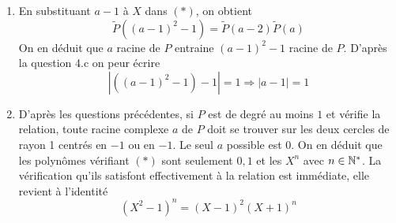 \begin{enumerate}
 \item En substituant $a-1$ à $X$ dans $(*)$, on obtient
\begin{displaymath}
 \widetilde{P}((a-1)^2-1)=\widetilde{P}(a-2)\widetilde{P}(a)
\end{displaymath}
On en déduit que $a$ racine de $P$ entraine $(a-1)^2-1$ racine de $P$. D'après la question 4.c on peur écrire 
\begin{displaymath}
|\left( (a-1)^2-1\right) -1|=1 \Rightarrow |a-1| = 1
\end{displaymath}

 \item D'après les questions précédentes, si $P$ est de degré au moins $1$ et vérifie la relation, toute racine complexe $a$ de $P$ doit se trouver sur les deux cercles de rayon 1 centrés en $-1$ ou en $-1$. Le seul $a$ possible est $0$. On en déduit que les polynômes vérifiant $(*)$ sont seulement $0,1$ et les $X^n$ avec $n\in \mathbb{N}^*$. La vérification qu'ils satisfont effectivement à la relation est immédiate, elle revient à l'identité
\begin{displaymath}
 (X^2-1)^n = (X-1)^2(X+1)^n
\end{displaymath}

\end{enumerate}
